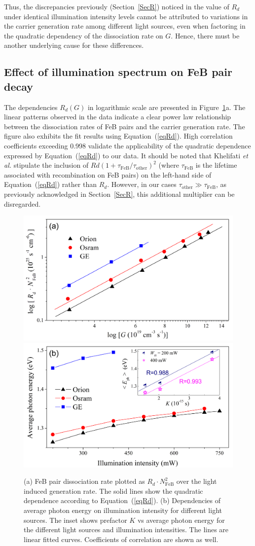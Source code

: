 \documentclass{WileyMSP-template}
\begin{document}
Thus, the discrepancies previously (Section~\ref{SecR}) noticed  in the value of $R_d$ under identical illumination intensity levels
cannot be attributed to variations in the carrier generation rate among different light sources,
even when factoring in the quadratic dependency of the dissociation rate on $G$.
Hence, there must be another underlying cause for these differences.


\subsection{Effect of illumination spectrum on FeB pair decay}\label{SecLast}

The dependencies $R_d (G)$ in logarithmic scale are presented in Figure~\ref{fig6}a.
The linear patterns observed in the data indicate a clear power law relationship between
the dissociation rates of FeB pairs and the carrier generation rate.
The figure also exhibits the fit results using Equation~(\ref{eqRd}).
High correlation coefficients exceeding 0.998 validate the applicability of the quadratic dependence expressed by Equation~(\ref{eqRd}) to our data.
It should be noted that Khelifati \emph{et al.} \cite{FeBKin2019} stipulate the inclusion of
$Rd\left(1+\tau_\mathrm{FeB}/\tau_\mathrm{other}\right)^2$ (where $\tau_\mathrm{FeB}$ is the lifetime associated with recombination on FeB pairs)
on the left-hand side of Equation~(\ref{eqRd}) rather than $R_d$.
However, in our cases $\tau_\mathrm{other}\gg \tau_\mathrm{FeB}$, as previously acknowledged in Section~\ref{SecR},
this additional multiplier can be disregarded.


\begin{figure}
\centering
  \includegraphics[width=0.4\linewidth]{Fig6a.png}
  \includegraphics[width=0.4\linewidth]{Fig6b.png}
  \caption{
  (a) FeB pair dissociation rate plotted as $R_d\cdot N_\mathrm{FeB}^2$ over the light induced
  generation rate. The solid lines show the quadratic dependence according to Equation~(\ref{eqRd}).
  (b) Dependencies of average photon energy on illumination intensity for different light sources.
  The inset shows prefactor $K$ vs average photon energy for the different light sources and illumination intensities.
  The lines are linear fitted curves. Coefficients of correlation are shown as well.
  }
  \label{fig6}
\end{figure}
\end{document}
